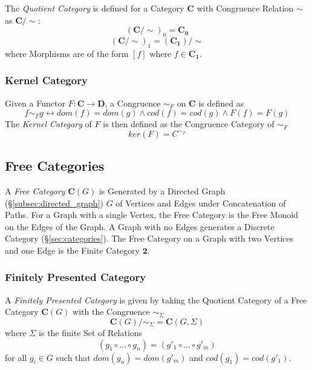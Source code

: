 The \emph{Quotient Category} is defined for a Category $\mathbf{C}$
with Congruence Relation $\sim$ as $\mathbf{C}/\sim$:
\[
    (\mathbf{C}/\sim)_0 = \mathbf{C_0}
\]\[
    (\mathbf{C}/\sim)_1 = (\mathbf{C_1})/\sim
\]
where Morphisms are of the form $[f]$ where $f \in \mathbf{C_1}$.

\subsubsection{Kernel Category}\label{subsec:kernel_category}

Given a Functor $F : \mathbf{C} \rightarrow \mathbf{D}$, a Congruence
$\sim_F$ on $\mathbf{C}$ is defined as
\[
    f \sim_F g \leftrightarrow dom(f) = dom(g) \wedge cod(f) = cod(g)
    \wedge F(f) = F(g)
\]
The \emph{Kernel Category} of $F$ is then defined as the Congruence
Category of $\sim_F$
\[
    ker(F) = C^{\sim_F}
\]

\subsection{Free Categories}\label{subsec:free_categories}

A \emph{Free Category} $\mathbf{C}(G)$ is Generated by a Directed
Graph (\S\ref{subsec:directed_graph}) $G$ of Vertices and Edges under
Concatenation of Paths. For a Graph with a single Vertex, the Free
Category is the Free Monoid on the Edges of the Graph. A Graph with no
Edges generates a Discrete Category (\S\ref{sec:categories}). The Free
Category on a Graph with two Vertices and one Edge is the Finite
Category $\mathbf{2}$.

\subsubsection{Finitely Presented Category}\label{subsec:finitely_presented}

A \emph{Finitely Presented Category} is given by taking the Quotient
Category of a Free Category $\mathbf{C}(G)$ with the Congruence
$\sim_\Sigma$
\[
    \mathbf{C}(G) / \sim_{\Sigma} = \mathbf{C}(G,\Sigma)
\]
where $\Sigma$ is the finite Set of Relations
\[
    (g_1 \circ \ldots \circ g_n) = (g'_1 \circ \ldots \circ g'_m)
\]
for all $g_i \in G$ such that $dom(g_n) = dom(g'_m)$ and $cod(g_1) =
cod(g'_1)$.


